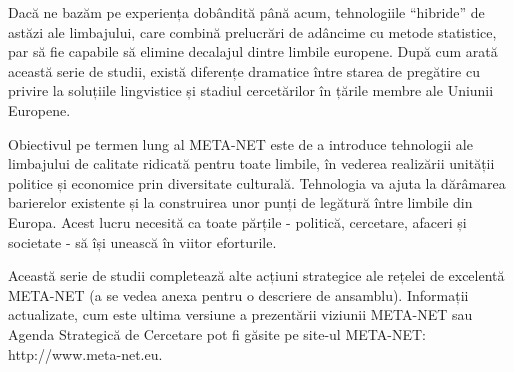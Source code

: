 \documentclass[]{../../metanetpaper}
\begin{document}
\begin{multicols}{2}

Dacă ne bazăm pe experiența dobândită până acum, tehnologiile “hibride” de astăzi ale limbajului, care combină prelucrări de adâncime cu metode statistice, par să fie capabile să elimine decalajul dintre limbile europene. După cum arată această serie de studii, există diferențe dramatice între starea de pregătire cu privire la soluțiile lingvistice și stadiul cercetărilor în țările membre ale Uniunii Europene.

Obiectivul pe termen lung al META-NET este de a introduce tehnologii ale limbajului de calitate ridicată pentru toate limbile, în vederea realizării unității politice și economice prin diversitate culturală. Tehnologia va ajuta la dărâmarea barierelor existente și la construirea unor punți de legătură între limbile din Europa. Acest lucru necesită ca toate părțile - politică, cercetare, afaceri și societate - să își unească în viitor eforturile.

Această serie de studii completează alte acțiuni strategice ale rețelei de excelentă META-NET (a se vedea anexa pentru o descriere de ansamblu). Informații actualizate, cum este ultima versiune a prezentării viziunii META-NET \cite{Meta1} sau Agenda Strategică de Cercetare pot fi găsite pe site-ul META-NET: http://www.meta-net.eu.
\end{multicols}

\clearpage

\end{document}
